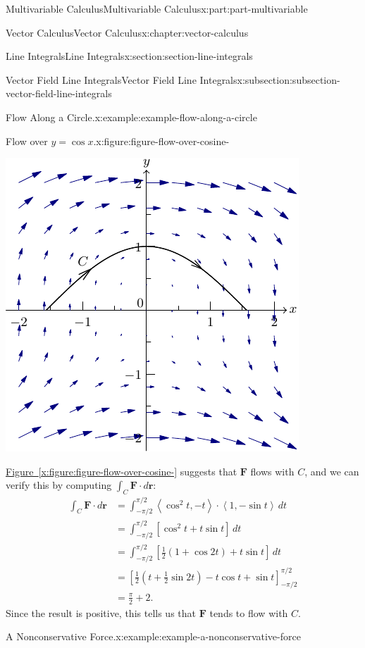 \documentclass[twoside,10pt,]{book}
\newcommand{\xreffont}{\relax}
\numberwithin{equation}{part}
\newcommand{\vb}[1]{\mathbf{#1}}
\newcommand{\dotprod}[1]{\left\langle #1 \right\rangle}
\newcommand{\brackets}[1]{\left[ #1 \right]}
\newcommand{\parens}[1]{\left( #1 \right)}
\newcommand{\amp}{&}
\begin{document}
\begin{partptx}{Multivariable Calculus}{}{Multivariable Calculus}{}{}{x:part:part-multivariable}
\begin{chapterptx}{Vector Calculus}{}{Vector Calculus}{}{}{x:chapter:vector-calculus}
\begin{sectionptx}{Line Integrals}{}{Line Integrals}{}{}{x:section:section-line-integrals}
\begin{subsectionptx}{Vector Field Line Integrals}{}{Vector Field Line Integrals}{}{}{x:subsection:subsection-vector-field-line-integrals}
\begin{example}{Flow Along a Circle.}{x:example:example-flow-along-a-circle}
\begin{figureptx}{Flow over \(y = \cos x\).}{x:figure:figure-flow-over-cosine-}{}
\begin{image}{0}{1}{0}
\includegraphics[width=\linewidth]{generated/asymptote/image-flow-over-cosine-.pdf}
\end{image}%
\tcblower
\end{figureptx}%
%
\par
\hyperref[x:figure:figure-flow-over-cosine-]{Figure~{\xreffont\ref{x:figure:figure-flow-over-cosine-}}} suggests that \(\vb{F}\) flows with \(C\), and we can verify this by computing \(\int_{C}\vb{F}\cdot d\vb{r}\):%
\begin{align*}
\int_{C}\vb{F}\cdot d\vb{r} \amp = \int_{-\pi/2}^{\pi/2} \dotprod{\cos^{2}t, -t}\cdot\dotprod{1,-\sin t}\,dt\\
\amp = \int_{-\pi/2}^{\pi/2} \brackets{\cos^{2}t + t\sin t}\,dt\\
\amp = \int_{-\pi/2}^{\pi/2} \brackets{ \frac{1}{2}\parens{1 + \cos 2t} + t\sin t}\,dt \\
\amp = \brackets{\frac{1}{2}\parens{ t + \frac{1}{2}\sin 2t} - t\cos t + \sin t}_{-\pi/2}^{\pi/2} \\
\amp = \frac{\pi}{2} + 2 \text{.}
\end{align*}
Since the result is positive, this tells us that \(\vb{F}\) tends to flow with \(C\).%
\end{example}
\begin{example}{A Nonconservative Force.}{x:example:example-a-nonconservative-force}%

\end{example}
\end{subsectionptx}
\end{sectionptx}
\end{chapterptx}
\end{partptx}
\end{document}

